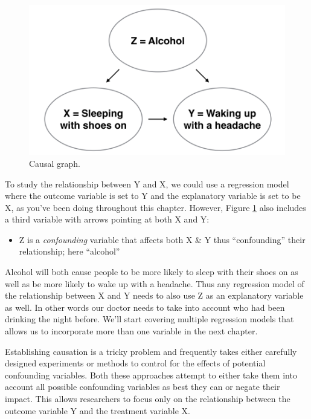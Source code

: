\documentclass[12pt, krantz2,]{krantz}
\providecommand{\tightlist}{%
  \setlength{\itemsep}{0pt}\setlength{\parskip}{0pt}}
\begin{document}
\begin{figure}

{\centering \includegraphics[width=\textwidth]{images/flowcharts/flowchart.009-cropped} 

}

\caption{Causal graph.}\label{fig:moderndive-figure-causal-graph}
\end{figure}

To study the relationship between Y and X, we could use a regression model where the outcome variable is set to Y and the explanatory variable is set to be X, as you've been doing throughout this chapter. However, Figure \ref{fig:moderndive-figure-causal-graph} also includes a third variable with arrows pointing at both X and Y:

\begin{itemize}
\tightlist
\item
  Z is a \emph{confounding} variable that affects both X \& Y thus ``confounding'' their relationship; here ``alcohol''
\end{itemize}

Alcohol will both cause people to be more likely to sleep with their shoes on as well as be more likely to wake up with a headache. Thus any regression model of the relationship between X and Y needs to also use Z as an explanatory variable as well. In other words our doctor needs to take into account who had been drinking the night before. We'll start covering multiple regression models that allows us to incorporate more than one variable in the next chapter.

Establishing causation is a tricky problem and frequently takes either carefully designed experiments or methods to control for the effects of potential confounding variables. Both these approaches attempt to either take them into account all possible confounding variables as best they can or negate their impact. This allows researchers to focus only on the relationship between the outcome variable Y and the treatment variable X.
\end{document}
